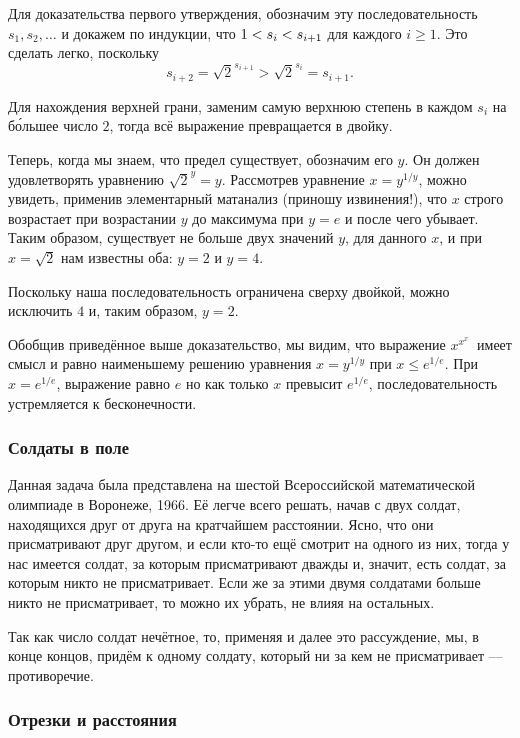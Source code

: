 Для доказательства первого утверждения, обозначим эту последовательность
$s_1, s_2,\dots$ и докажем по индукции, что $1<s_i\z<s_{i+1}$
для каждого $i\ge 1$.
Это сделать легко, поскольку \[s_{i+2}=
{\sqrt{2}}^{s_{i+1}}
>{\sqrt{2}}^{s_{i}}
=s_{i+1}.\]

Для нахождения верхней грани, заменим самую верхнюю степень в каждом $s_i$ на б\'{о}льшее число $2$, тогда всё выражение превращается в двойку.

Теперь, когда мы знаем, что предел существует, обозначим его $y$.
Он должен удовлетворять уравнению ${\sqrt{2}}^y=y$.
Рассмотрев уравнение $x=y^{1/y}$, 
можно увидеть, применив элементарный матанализ (приношу извинения!), 
что $x$ строго возрастает при возрастании $y$ до максимума при $y=e$
и после чего убывает.
Таким образом, существует не больше двух значений $y$, для данного $x$, 
и при $x=\sqrt{2}$ нам известны оба: $y=2$ и $y=4$.

Поскольку наша последовательность ограничена сверху двойкой, можно исключить $4$ и, таким образом, $y=2$.\heart

Обобщив приведённое выше доказательство, мы видим, что выражение $x^{x^{x^{{\cdot}^{\cdot}}}}$
имеет смысл и равно наименьшему решению уравнения $x=y^{1/y}$ при $x\le e^{1/e}$.
При $x=e^{1/e}$, выражение равно $e$ но как только $x$ превысит $e^{1/e}$, последовательность устремляется к бесконечности.

\subsubsection*{Солдаты в поле}%

Данная задача была представлена на шестой Всероссийской математической олимпиаде в Воронеже, 1966.
Её легче всего решать, начав с двух солдат, находящихся друг от друга на кратчайшем расстоянии.
Ясно, что они присматривают друг другом, и если кто-то ещё смотрит на одного из них, тогда у нас имеется солдат, за которым присматривают дважды и, значит, есть солдат, за которым никто не присматривает.
Если же за этими двумя солдатами больше никто не присматривает, то можно их убрать, не влияя на остальных.

Так как число солдат нечётное, то, применяя и далее это рассуждение, мы, в конце концов, придём к одному солдату, который ни за кем не присматривает --- противоречие.\heart

\subsubsection*{Отрезки и расстояния} %

